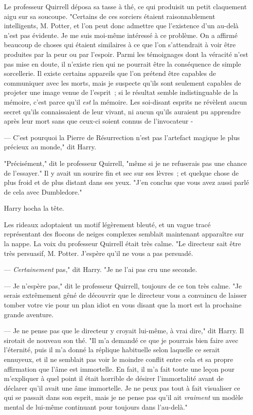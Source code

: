 Le professeur Quirrell déposa sa tasse à thé, ce qui produisit un petit claquement aigu sur sa soucoupe. "Certains de ces sorciers étaient raisonnablement intelligents, M. Potter, et l'on peut donc admettre que l'existence d'un au-delà n'est pas évidente. Je me suis moi-même intéressé à ce problème. On a affirmé beaucoup de choses qui étaient similaires à ce que l'on s'attendrait à voir être produites par la peur ou par l'espoir. Parmi les témoignages dont la véracité n'est pas mise en doute, il n'existe rien qui ne pourrait être la conséquence de simple sorcellerie. Il existe certains appareils que l'on prétend être capables de communiquer avec les morts, mais je suspecte qu'ils sont seulement capables de projeter une image venue de l'esprit~; si le résultat semble indistinguable de la mémoire, c'est parce qu'il \emph{est} la mémoire. Les soi-disant esprits ne révèlent aucun secret qu'ils connaissaient de leur vivant, ni aucun qu'ils auraient pu apprendre après leur mort sans que ceux-ci soient connus de l'invocateur -

--- C'est pourquoi la Pierre de Résurrection n'est pas l'artefact magique le plus précieux au monde," dit Harry.

"Précisément," dit le professeur Quirrell, "même si je ne refuserais pas une chance de l'essayer." Il y avait un sourire fin et sec sur ses lèvres~; et quelque chose de plus froid et de plus distant dans ses yeux. "J'en conclus que vous avez aussi parlé de cela avec Dumbledore."

Harry hocha la tête.

Les rideaux adoptaient un motif légèrement bleuté, et un vague tracé représentant des flocons de neiges complexes semblait maintenant apparaître sur la nappe. La voix du professeur Quirrell était très calme. "Le directeur sait être très persuasif, M. Potter. J'espère qu'il ne vous a pas persuadé.

--- \emph{Certainement} pas," dit Harry. "Je ne l'ai pas cru une seconde.

--- Je n'espère pas," dit le professeur Quirrell, toujours de ce ton très calme. "Je serais extrêmement gêné de découvrir que le directeur vous a convaincu de laisser tomber votre vie pour un plan idiot en vous disant que la mort est la prochaine grande aventure.

--- Je ne pense pas que le directeur y croyait lui-même, à vrai dire," dit Harry. Il sirotait de nouveau son thé. "Il m'a demandé ce que je pourrais bien faire avec l'éternité, puis il m'a donné la réplique habituelle selon laquelle ce serait ennuyeux, et il ne semblait pas voir le moindre conflit entre cela et sa propre affirmation que l'âme est immortelle. En fait, il m'a fait toute une leçon pour m'expliquer à quel point il était horrible de désirer l'immortalité avant de déclarer qu'il avait une âme immortelle. Je ne peux pas tout à fait visualiser ce qui se passait dans son esprit, mais je ne pense pas qu'il ait \emph{vraiment} un modèle mental de lui-même continuant pour toujours dans l'au-delà."

